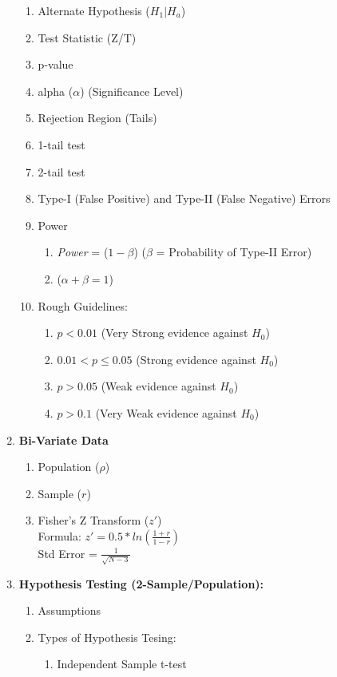 \documentclass[11pt]{article}
\begin{document}
\begin{enumerate}
\begin{enumerate}
			\item Alternate Hypothesis ($H_1 | H_a$)
			\item Test Statistic (Z/T)
			\item p-value 
			\item alpha ($\alpha$) (Significance Level)
			\item Rejection Region (Tails)
			\item 1-tail test
			\item 2-tail test
			\item Type-I (False Positive) and Type-II (False Negative) Errors
			\item Power
			\begin{enumerate}
				\item \textit{Power} = ($1 - \beta$) ($\beta$ = Probability of Type-II Error)
				\item ($\alpha + \beta = 1$) 
			\end{enumerate}
			\item Rough Guidelines:
			\begin{enumerate}
				\item $p < 0.01$ (Very Strong evidence against $H_0$)
				\item $0.01 < p \leq 0.05$ (Strong evidence against $H_0$)
				\item $p > 0.05$ (Weak evidence against $H_0$)
				\item $p > 0.1$ (Very Weak evidence against $H_0$)
			\end{enumerate}
		\end{enumerate} 
		\item \textbf{Bi-Variate Data}
		\begin{enumerate}
			\item Population ($\rho$)
			\item Sample ($r$)
			\item Fisher's Z Transform ($z'$) \\
			Formula:
			$z' = 0.5 * ln(\frac{1 + r}{1 - r})  $ \\
			Std Error = $\frac{1}{\sqrt{N - 3}}$
		\end{enumerate}
		\item \textbf{Hypothesis Testing (2-Sample/Population):}
		\begin{enumerate}
			\item Assumptions
			\item Types of Hypothesis Tesing:
			\begin{enumerate}
				\item Independent Sample t-test

\end{enumerate}
\end{enumerate}
\end{enumerate}
\end{document}

